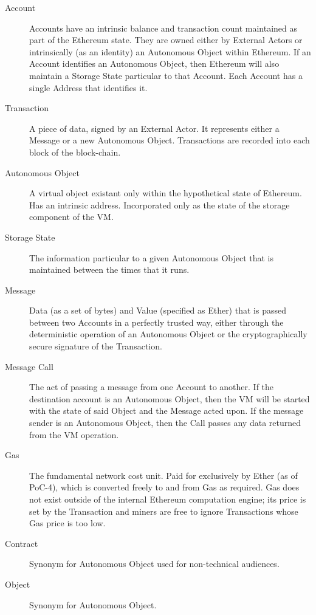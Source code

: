 \documentclass[9pt,oneside]{amsart}
\begin{document}
\begin{multicols}{2}
\begin{description}
\item[Account] Accounts have an intrinsic balance and transaction count maintained as part of the Ethereum state. They are owned either by External Actors or intrinsically (as an identity) an Autonomous Object within Ethereum. If an Account identifies an Autonomous Object, then Ethereum will also maintain a Storage State particular to that Account. Each Account has a single Address that identifies it.

\item[Transaction] A piece of data, signed by an External Actor. It represents either a Message or a new Autonomous Object. Transactions are recorded into each block of the block-chain.

\item[Autonomous Object] A virtual object existant only within the hypothetical state of Ethereum.  Has an intrinsic address. Incorporated only as the state of the storage component of the VM.

\item[Storage State] The information particular to a given Autonomous Object that is maintained between the times that it runs.

\item[Message] Data (as a set of bytes) and Value (specified as Ether) that is passed between two Accounts in a perfectly trusted way, either through the deterministic operation of an Autonomous Object or the cryptographically secure signature of the Transaction.

\item[Message Call] The act of passing a message from one Account to another. If the destination account is an Autonomous Object, then the VM will be started with the state of said Object and the Message acted upon. If the message sender is an Autonomous Object, then the Call passes any data returned from the VM operation.

\item[Gas] The fundamental network cost unit. Paid for exclusively by Ether (as of PoC-4), which is converted freely to and from Gas as required. Gas does not exist outside of the internal Ethereum computation engine; its price is set by the Transaction and miners are free to ignore Transactions whose Gas price is too low.

\item[Contract] Synonym for Autonomous Object used for non-technical audiences.

\item[Object] Synonym for Autonomous Object.


\end{description}
\end{multicols}
\end{document}

